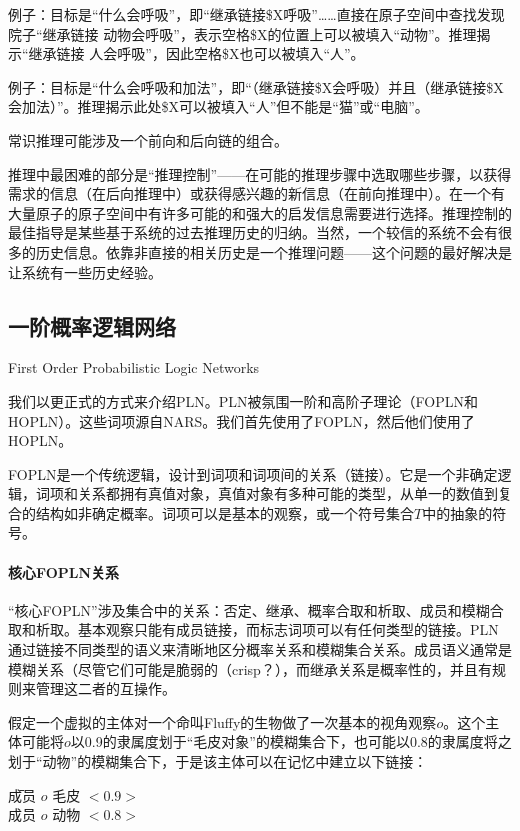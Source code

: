 例子：目标是“什么会呼吸”，即“继承链接\$X呼吸”……直接在原子空间中查找发现院子“继承链接 动物会呼吸”，表示空格\$X的位置上可以被填入“动物”。推理揭示“继承链接 人会呼吸”，因此空格\$X也可以被填入“人”。

例子：目标是“什么会呼吸和加法”，即“（继承链接\$X会呼吸）并且（继承链接\$X会加法）”。推理揭示此处\$X可以被填入“人”但不能是“猫”或“电脑”。

常识推理可能涉及一个前向和后向链的组合。

推理中最困难的部分是“推理控制”——在可能的推理步骤中选取哪些步骤，以获得需求的信息（在后向推理中）或获得感兴趣的新信息（在前向推理中）。在一个有大量原子的原子空间中有许多可能的和强大的启发信息需要进行选择。推理控制的最佳指导是某些基于系统的过去推理历史的归纳。当然，一个较信的系统不会有很多的历史信息。依靠非直接的相关历史是一个推理问题——这个问题的最好解决是让系统有一些历史经验。

\subsection{一阶概率逻辑网络}{First Order Probabilistic Logic Networks}

我们以更正式的方式来介绍PLN。PLN被氛围一阶和高阶子理论（FOPLN和HOPLN）。这些词项源自NARS\cite{Wang2006}。我们首先使用了FOPLN，然后他们使用了HOPLN。

FOPLN是一个传统逻辑，设计到词项和词项间的关系（链接）。它是一个非确定逻辑，词项和关系都拥有真值对象，真值对象有多种可能的类型，从单一的数值到复合的结构如非确定概率。词项可以是基本的观察，或一个符号集合$T$中的抽象的符号。

\paragraph{核心FOPLN关系}

“核心FOPLN”涉及集合中的关系：否定、继承、概率合取和析取、成员和模糊合取和析取。基本观察只能有成员链接，而标志词项可以有任何类型的链接。PLN通过链接不同类型的语义来清晰地区分概率关系和模糊集合关系。成员语义通常是模糊关系（尽管它们可能是脆弱的（crisp？），而继承关系是概率性的，并且有规则来管理这二者的互操作。

假定一个虚拟的主体对一个命叫Fluffy的生物做了一次基本的视角观察$o$。这个主体可能将$o$以0.9的隶属度划于“毛皮对象”的模糊集合下，也可能以0.8的隶属度将之划于“动物”的模糊集合下，于是该主体可以在记忆中建立以下链接：

 \begin{tabbing}
\=成员 $o$ 毛皮 $< 0.9 >$ \\
\>成员 $o$ 动物 $< 0.8 >$ \\
\end{tabbing}

